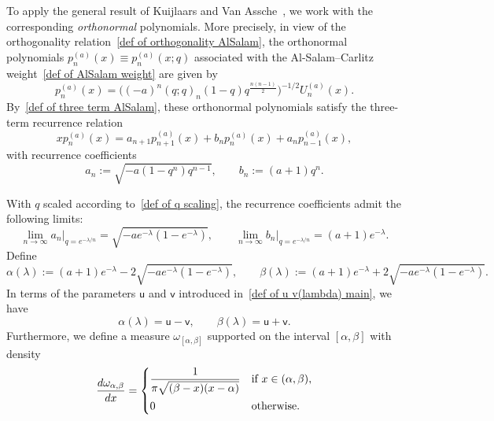 \documentclass{amsart}
\theoremstyle{plain}
\theoremstyle{remark}
\numberwithin{equation}{section}
\begin{document}
To apply the general result of Kuijlaars and Van Assche~\cite{KA99}, we work with the corresponding \emph{orthonormal} polynomials.
More precisely, in view of the orthogonality relation~\eqref{def of orthogonality AlSalam}, the orthonormal polynomials \( p_n^{(a)}(x) \equiv p_n^{(a)}(x;q) \) associated with the Al-Salam--Carlitz weight~\eqref{def of AlSalam weight} are given by
\begin{equation}
    p_{n}^{(a)}(x)=\Big((-a)^{n}(q;q)_{n}(1-q)q^{\frac{n(n-1)}{2}}\Big)^{-1/2}U_{n}^{(a)}(x).
\end{equation}
By~\eqref{def of three term AlSalam}, these orthonormal polynomials satisfy the three-term recurrence relation
\begin{equation} \label{eqn:orthonormal alsalam threeterm}
    x p_n^{(a)}(x) = a_{n+1} p_{n+1}^{(a)}(x) + b_n p_n^{(a)}(x) + a_n p_{n-1}^{(a)}(x),
\end{equation}
with recurrence coefficients
\begin{equation}
    a_n := \sqrt{ -a (1 - q^n) q^{n-1} }, \qquad b_n := (a + 1) q^n.
\end{equation}

With \( q \) scaled according to~\eqref{def of q scaling}, the recurrence coefficients admit the following limits:
\begin{equation}
  \lim_{n\rightarrow \infty} a_{n} \Big|_{q= e^{- \lambda/n }} = \sqrt{ -a e^{-\lambda} (1 - e^{-\lambda}) }, 
  \qquad 
  \lim_{n\rightarrow \infty} b_{n} \Big|_{q= e^{- \lambda/n }} = (a + 1) e^{-\lambda}.
\end{equation}
Define
\begin{equation} \label{def of alphabeta}
    \alpha(\lambda) := (a+1)e^{-\lambda} - 2 \sqrt{ -a e^{-\lambda} (1 - e^{-\lambda}) }, 
    \qquad 
    \beta(\lambda) := (a+1)e^{-\lambda} + 2 \sqrt{ -a e^{-\lambda} (1 - e^{-\lambda}) }.
\end{equation}
In terms of the parameters \( \mathsf{u} \) and \( \mathsf{v} \) introduced in~\eqref{def of u v(lambda) main}, we have 
\[
\alpha(\lambda) = \mathsf{u} - \mathsf{v}, \qquad \beta(\lambda) = \mathsf{u} + \mathsf{v}.
\]
Furthermore, we define a measure \( \omega_{[\alpha,\beta]} \) supported on the interval \( [\alpha, \beta] \) with density
\begin{equation}
    \frac{d\omega_{\alpha,\beta}}{dx} =
    \begin{cases}
        \displaystyle\frac{1}{\pi \sqrt{(\beta - x)(x - \alpha)}} & \text{if } x \in (\alpha, \beta),\smallskip \\
        0 & \text{otherwise.}
    \end{cases}
\end{equation}
\end{document}
